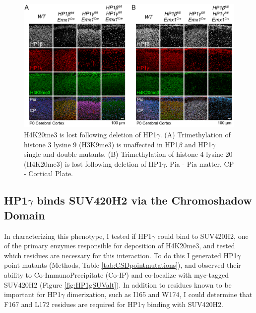 \documentclass[onehalf,12pt]{beavtex}
\begin{document}
  \begin{figure}
  
  {\centering \includegraphics[width=1\linewidth, ]{./figure/results/H3K9H4K20landscape} 
  
  }
  
  \caption[H4K20me3 is lost following deletion of HP1$\gamma$]{H4K20me3 is lost following deletion of HP1$\gamma$. (A) Trimethylation of histone 3 lysine 9 (H3K9me3) is unaffected in HP1$\beta$ and HP1$\gamma$ single and double mutants. (B) Trimethylation of histone 4 lysine 20 (H4K20me3) is lost following deletion of HP1$\gamma$. Pia - Pia matter, CP - Cortical Plate.}\label{fig:H4K20me3loss}
  \end{figure}
  
  \FloatBarrier
  
  \subsection{\texorpdfstring{HP1\(\gamma\) binds SUV420H2 via the
  Chromoshadow
  Domain}{HP1\textbackslash{}gamma binds SUV420H2 via the Chromoshadow Domain}}\label{hp1gamma-binds-suv420h2-via-the-chromoshadow-domain}
  
  In characterizing this phenotype, I tested if HP1\(\gamma\) could bind
  to SUV420H2, one of the primary enzymes responsible for deposition of
  H4K20me3, and tested which residues are necessary for this interaction.
  To do this I generated HP1\(\gamma\) point mutants (Methods, Table
  \ref{tab:CSDpointmutations}), and observed their ability to
  Co-ImmunoPrecipitate (Co-IP) and co-localize with myc-tagged SUV420H2
  (Figure \ref{fig:HP1gSUValt}). In addition to residues known to be
  important for HP1\(\gamma\) dimerization, such as I165 and W174, I could
  determine that F167 and L172 residues are required for HP1\(\gamma\)
  binding with SUV420H2.
  
\end{document}
